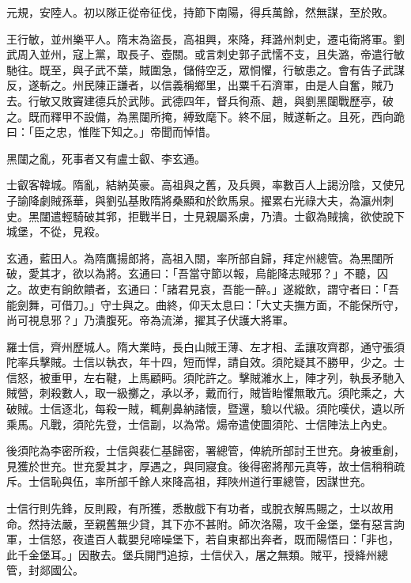 \begin{pinyinscope}
 元規，安陸人。初以隊正從帝征伐，持節下南陽，得兵萬餘，然無謀，至於敗。



 王行敏，並州樂平人。隋末為盜長，高祖興，來降，拜潞州刺史，遷屯衛將軍。劉武周入並州，寇上黨，取長子、壺關。或言刺史郭子武懦不支，且失潞，帝遣行敏馳往。既至，與子武不葉，賊圍急，儲偫空乏，眾恫懼，行敏患之。會有告子武謀反，遂斬之。州民陳正謙者，以信義稱鄉里，出粟千石濟軍，由是人自奮，賊乃去。行敏又敗竇建德兵於武陟。武德四年，督兵徇燕、趙，與劉黑闥戰歷亭，破之。既而釋甲不設備，為黑闥所掩，縛致麾下。終不屈，賊遂斬之。且死，西向跪曰：「臣之忠，惟陛下知之。」帝聞而悼惜。



 黑闥之亂，死事者又有盧士叡、李玄通。



 士叡客韓城。隋亂，結納英豪。高祖與之舊，及兵興，率數百人上謁汾陰，又使兄子諭降劇賊孫華，與劉弘基敗隋將桑顯和於飲馬泉。擢累右光祿大夫，為瀛州刺史。黑闥遣輕騎破其郛，拒戰半日，士見親屬系虜，乃潰。士叡為賊擒，欲使說下城堡，不從，見殺。



 玄通，藍田人。為隋鷹揚郎將，高祖入關，率所部自歸，拜定州總管。為黑闥所破，愛其才，欲以為將。玄通曰：「吾當守節以報，烏能降志賊邪？」不聽，囚之。故吏有餉飲饋者，玄通曰：「諸君見哀，吾能一醉。」遂縱飲，謂守者曰：「吾能劍舞，可借刀。」守士與之。曲終，仰天太息曰：「大丈夫撫方面，不能保所守，尚可視息邪？」乃潰腹死。帝為流涕，擢其子伏護大將軍。



 羅士信，齊州歷城人。隋大業時，長白山賊王薄、左才相、孟讓攻齊郡，通守張須陀率兵擊賊。士信以執衣，年十四，短而悍，請自效。須陀疑其不勝甲，少之。士信怒，被重甲，左右鞬，上馬顧眄。須陀許之。擊賊濰水上，陣才列，執長矛馳入賊營，刺殺數人，取一級擲之，承以矛，戴而行，賊皆眙懼無敢亢。須陀乘之，大破賊。士信逐北，每殺一賊，輒劓鼻納諸懷，暨還，驗以代級。須陀嘆伏，遺以所乘馬。凡戰，須陀先登，士信副，以為常。煬帝遣使圖須陀、士信陣法上內史。



 後須陀為李密所殺，士信與裴仁基歸密，署總管，俾統所部討王世充。身被重創，見獲於世充。世充愛其才，厚遇之，與同寢食。後得密將邴元真等，故士信稍稍疏斥。士信恥與伍，率所部千餘人來降高祖，拜陜州道行軍總管，因謀世充。



 士信行則先鋒，反則殿，有所獲，悉散戲下有功者，或脫衣解馬賜之，士以故用命。然持法嚴，至親舊無少貸，其下亦不甚附。師次洛陽，攻千金堡，堡有惡言訽軍，士信怒，夜遣百人載嬰兒啼噪堡下，若自東都出奔者，既而陽悟曰：「非也，此千金堡耳。」因散去。堡兵開門追掠，士信伏入，屠之無類。賊平，授絳州總管，封郯國公。




\end{pinyinscope}
